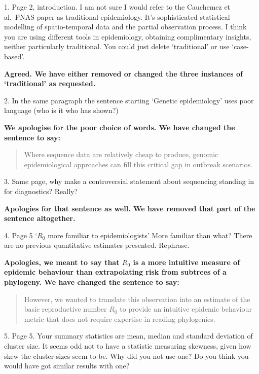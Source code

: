 \documentclass[11pt,oneside,letterpaper]{article}
\begin{document}
1. Page 2, introduction. I am not sure I would refer to the Cauchemez et al.\ PNAS paper as traditional epidemiology. It's sophisticated statistical modelling of spatio-temporal data and the partial observation process. I think you are using different tools in epidemiology, obtaining complimentary insights, neither particularly traditional. You could just delete `traditional' or use `case-based'.

\textbf{Agreed. We have either removed or changed the three instances of `traditional' as requested.}

2. In the same paragraph the sentence starting `Genetic epidemiology' uses poor language (who is it who has shown?)

\textbf{We apologise for the poor choice of words. We have changed the sentence to say:}

\begin{quotation}
Where sequence data are relatively cheap to produce, genomic epidemiological approaches can fill this critical gap in outbreak scenarios.
\end{quotation}

3. Same page, why make a controversial statement about sequencing standing in for diagnostics? Really?

\textbf{Apologies for that sentence as well. We have removed that part of the sentence altogether.}

4. Page 5 `$R_0$ more familiar to epidemiologists' More familiar than what? There are no previous quantitative estimates presented. Rephrase.

\textbf{Apologies, we meant to say that $R_{0}$ is a more intuitive measure of epidemic behaviour than extrapolating risk from subtrees of a phylogeny. We have changed the sentence to say:}

\begin{quotation}
However, we wanted to translate this observation into an estimate of the basic reproductive number $R_{0}$ to provide an intuitive epidemic behaviour metric that does not require expertise in reading phylogenies.
\end{quotation}

5. Page 5. Your summary statistics are mean, median and standard deviation of cluster size. It seems odd not to have a statistic measuring skewness, given how skew the cluster sizes seem to be. Why did you not use one? Do you think you would have got similar results with one?
\end{document}
